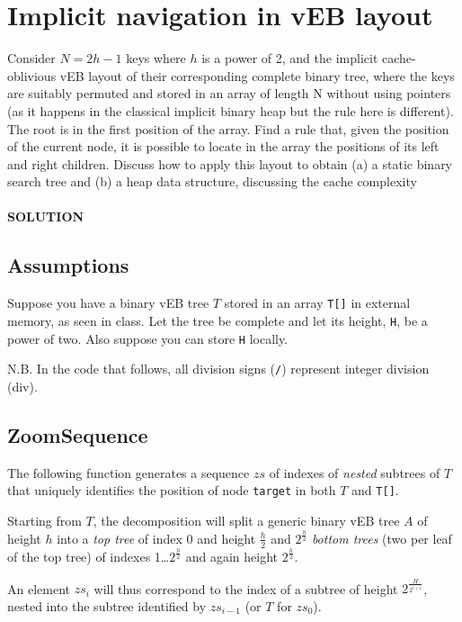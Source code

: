 \documentclass[a4paper]{article}
\begin{document}
\section*{Implicit navigation in vEB layout}
Consider $N = 2h − 1$ keys where $h$ is a power of 2,
and the implicit cache-oblivious vEB layout of their corresponding complete binary
tree, where the keys are suitably permuted and stored in an array of length N without
using pointers (as it happens in the classical implicit binary heap but the rule here
is different). The root is in the first position of the array. Find a rule that, given the
position of the current node, it is possible to locate in the array the positions of its
left and right children. Discuss how to apply this layout to obtain (a) a static binary
search tree and (b) a heap data structure, discussing the cache complexity
\\
\\
\textbf{SOLUTION}
\subsection*{Assumptions}
Suppose you have a binary vEB tree $T$ stored in an array \texttt{T[]} in external memory, as seen in class. Let the tree be complete and let its height, \texttt{H}, be a power of two. Also suppose you can store \texttt{H} locally.
\\
\begin{tiny}N.B. In the code that follows, all division signs (\texttt{/}) represent integer division (div).\end{tiny}

\subsection*{ZoomSequence}
The following function generates a sequence $zs$ of indexes of \emph{nested} subtrees of $T$ that uniquely identifies the position of node \texttt{target} in both $T$ and \texttt{T[]}.

Starting from $T$, the decomposition will split a generic binary vEB tree $A$ of height $h$ into a \emph{top tree} of index $0$ and height $\frac{h}{2}$ and $2^\frac{h}{2}$ \emph{bottom trees} (two per leaf of the top tree) of indexes 1\dots $2^\frac{h}{2}$ and again height $2^\frac{h}{2}$.

An element $zs_i$ will thus correspond to the index of a subtree of height $2^\frac{H}{2^{i+1}}$, nested into the subtree identified by $zs_{i-1}$ (or $T$ for $zs_0$).
\end{document}
